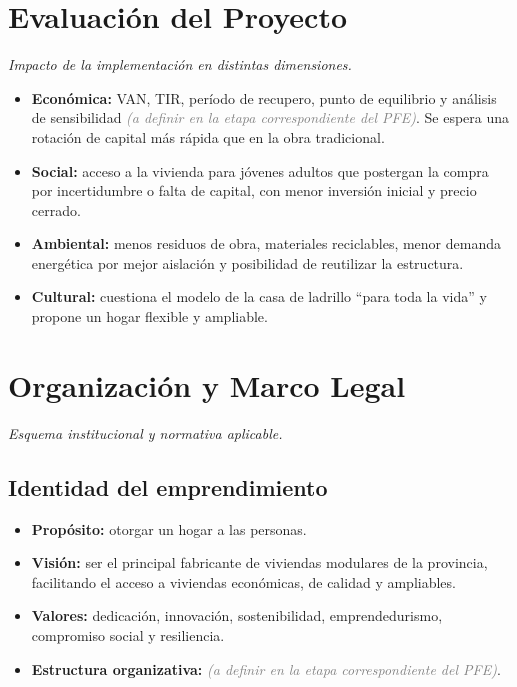 \documentclass[11pt,a4paper]{article}
\newcommand{\pend}{\textcolor{gray}{\textit{(a definir en la etapa correspondiente del PFE)}}}
\begin{document}
\section{Evaluación del Proyecto}
\textit{Impacto de la implementación en distintas dimensiones.}

\begin{itemize}
  \item \textbf{Económica:} VAN, TIR, período de recupero, punto de equilibrio y análisis de sensibilidad \pend. Se espera una rotación de capital más rápida que en la obra tradicional.
  \item \textbf{Social:} acceso a la vivienda para jóvenes adultos que postergan la compra por incertidumbre o falta de capital, con menor inversión inicial y precio cerrado.
  \item \textbf{Ambiental:} menos residuos de obra, materiales reciclables, menor demanda energética por mejor aislación y posibilidad de reutilizar la estructura.
  \item \textbf{Cultural:} cuestiona el modelo de la casa de ladrillo ``para toda la vida'' y propone un hogar flexible y ampliable.
\end{itemize}

\section{Organización y Marco Legal}
\textit{Esquema institucional y normativa aplicable.}

\subsection{Identidad del emprendimiento}
\begin{itemize}
  \item \textbf{Propósito:} otorgar un hogar a las personas.
  \item \textbf{Visión:} ser el principal fabricante de viviendas modulares de la provincia, facilitando el acceso a viviendas económicas, de calidad y ampliables.
  \item \textbf{Valores:} dedicación, innovación, sostenibilidad, emprendedurismo, compromiso social y resiliencia.
  \item \textbf{Estructura organizativa:} \pend.
\end{itemize}
\end{document}
